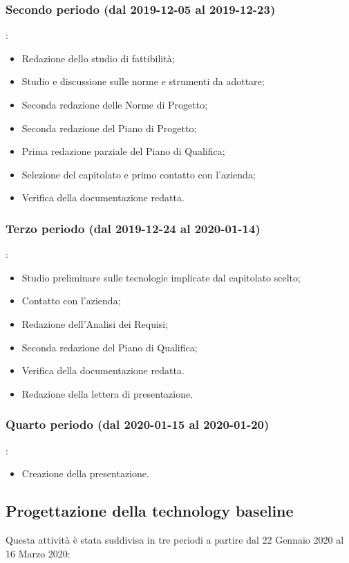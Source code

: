 		\subsubsection{Secondo periodo (dal 2019-12-05 al 2019-12-23)}:
		\begin{itemize}
			\item Redazione dello studio di fattibilità;
			\item Studio e discussione sulle norme e strumenti da adottare;
			\item Seconda redazione delle Norme di Progetto;
			\item Seconda redazione del Piano di Progetto;
			\item Prima redazione parziale del Piano di Qualifica;
			\item Selezione del capitolato e primo contatto con l'azienda;
			\item Verifica della documentazione redatta.
		\end{itemize}
		\subsubsection{Terzo periodo (dal 2019-12-24 al 2020-01-14)}:
		\begin{itemize}
			\item Studio preliminare sulle tecnologie implicate dal capitolato scelto;
			\item Contatto con l'azienda;
			\item Redazione dell'Analisi dei Requisi;
			\item Seconda redazione del Piano di Qualifica;
			\item Verifica della documentazione redatta.
			\item Redazione della lettera di presentazione.
		\end{itemize}
		\subsubsection{Quarto periodo (dal 2020-01-15 al 2020-01-20)}:
		\begin{itemize}
			\item Creazione della presentazione. 
		\end{itemize}

	\subsection{Progettazione della technology baseline}
	Questa attività è stata suddivisa in tre periodi a partire dal 22 Gennaio 2020 al 16 Marzo 2020:

